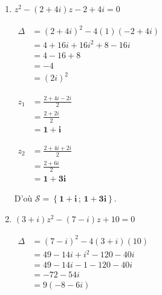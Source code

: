 \documentclass[12pt,a4paper]{article}
\begin{document}
\begin{enumerate}
\begin{enumerate}
        $
        \begin{aligned}
            z_2 &= \frac{-(1 - 5i) + (1 - i)}{2i}\\
            &= \frac{-1 + 5i + 1 - i}{2i}\\
            &= \frac{4i}{2i}\\
            &= \mathbf{2}
        \end{aligned}
        $
        
        D'où $\mathcal{S} = \left\{\mathbf{3 + i \,;\, 2}\right\}$.

        \item $z^2 - (2 + 4i)z - 2 + 4i = 0$
        
        $
        \begin{aligned}
            \Delta &= (2 + 4i)^2 - 4(1)(-2 + 4i)\\
            &= 4 + 16i + 16i^2 + 8 - 16i\\
            &= 4 - 16 + 8\\
            &= -4\\
            &= (2i)^2
        \end{aligned}
        $
        
        $
        \begin{aligned}
            z_1 &= \frac{2 + 4i - 2i}{2}\\
            &= \frac{2 + 2i}{2}\\
            &= \mathbf{1 + i}
        \end{aligned}
        $
        
        $
        \begin{aligned}
            z_2 &= \frac{2 + 4i + 2i}{2}\\
            &= \frac{2 + 6i}{2}\\
            &= \mathbf{1 + 3i}
        \end{aligned}
        $
        
        D'où $\mathcal{S} = \left\{\mathbf{1 + i \,;\, 1 + 3i}\right\}$.

        \item $(3 + i)z^2 - (7 - i)z + 10 = 0$
        
        $
        \begin{aligned}
            \Delta &= (7 - i)^2 - 4(3 + i)(10)\\
            &= 49 - 14i + i^2 - 120 - 40i\\
            &= 49 - 14i - 1 - 120 - 40i\\
            &= -72 - 54i\\
            &= 9(-8 - 6i)
        \end{aligned}
        $
        

\end{enumerate}
\end{enumerate}
\end{document}
